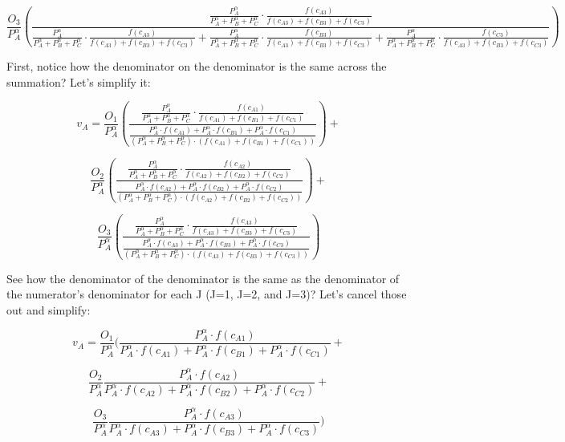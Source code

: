 \documentclass[]{elsarticle} %
\begin{document}
\[
\frac{O_3}{P_{A}^\alpha}(\frac{\frac{P_{A}^\alpha}{P_{A}^\alpha+P_{B}^\alpha+P_{C}^\alpha} \cdot \frac{f(c_{A3})}{f(c_{A3})+f(c_{B3})+f(c_{C3})}}{\frac{P_{A}^\alpha}{P_{A}^\alpha+P_{B}^\alpha+P_{C}^\alpha} \cdot \frac{f(c_{A3})}{f(c_{A3})+f(c_{B3})+f(c_{C3})} + \frac{P_{A}^\alpha}{P_{A}^\alpha+P_{B}^\alpha+P_{C}^\alpha} \cdot \frac{f(c_{B3})}{f(c_{A3})+f(c_{B3})+f(c_{C3})}+\frac{P_{A}^\alpha}{P_{A}^\alpha+P_{B}^\alpha+P_{C}^\alpha} \cdot \frac{f(c_{C3})}{f(c_{A3})+f(c_{B3})+f(c_{C3})}} )
\]

First, notice how the denominator on the denominator is the same across
the summation? Let's simplify it:

\[
v_{A} = \frac{O_1}{P_{A}^\alpha}(\frac{\frac{P_{A}^\alpha}{P_{A}^\alpha+P_{B}^\alpha+P_{C}^\alpha} \cdot \frac{f(c_{A1})}{f(c_{A1})+f(c_{B1})+f(c_{C1})}}{\frac{P_{A}^\alpha \cdot f(c_{A1}) + P_{A}^\alpha \cdot f(c_{B1}) + P_{A}^\alpha \cdot f(c_{C1})}{(P_{A}^\alpha+P_{B}^\alpha+P_{C}^\alpha) \cdot (f(c_{A1})+f(c_{B1})+f(c_{C1}))}}) +
\]

\[\frac{O_2}{P_{A}^\alpha}(\frac{\frac{P_{A}^\alpha}{P_{A}^\alpha+P_{B}^\alpha+P_{C}^\alpha} \cdot \frac{f(c_{A2})}{f(c_{A2})+f(c_{B2})+f(c_{C2})}}{\frac{P_{A}^\alpha \cdot f(c_{A2}) + P_{A}^\alpha \cdot f(c_{B2}) + P_{A}^\alpha \cdot f(c_{C2})}{(P_{A}^\alpha+P_{B}^\alpha+P_{C}^\alpha) \cdot (f(c_{A2})+f(c_{B2})+f(c_{C2}))}}) +
\]

\[
\frac{O_3}{P_{A}^\alpha}(\frac{\frac{P_{A}^\alpha}{P_{A}^\alpha+P_{B}^\alpha+P_{C}^\alpha} \cdot \frac{f(c_{A3})}{f(c_{A3})+f(c_{B3})+f(c_{C3})}}{\frac{P_{A}^\alpha \cdot f(c_{A3}) + P_{A}^\alpha \cdot f(c_{B3}) + P_{A}^\alpha \cdot f(c_{C3})}{(P_{A}^\alpha+P_{B}^\alpha+P_{C}^\alpha) \cdot (f(c_{A3})+f(c_{B3})+f(c_{C3}))}} )
\]

See how the denominator of the denominator is the same as the
denominator of the numerator's denominator for each J (J=1, J=2, and
J=3)? Let's cancel those out and simplify:

\[
v_{A} = \frac{O_1}{P_{A}^\alpha}(\frac{P_{A}^\alpha \cdot f(c_{A1})}{P_{A}^\alpha \cdot f(c_{A1}) + P_{A}^\alpha \cdot f(c_{B1}) + P_{A}^\alpha \cdot f(c_{C1})} +
\]

\[\frac{O_2}{P_{A}^\alpha}\frac{P_{A}^\alpha \cdot f(c_{A2})}{P_{A}^\alpha \cdot f(c_{A2}) + P_{A}^\alpha \cdot f(c_{B2}) + P_{A}^\alpha \cdot f(c_{C2})} +
\]

\[
\frac{O_3}{P_{A}^\alpha}\frac{P_{A}^\alpha \cdot f(c_{A3})}{P_{A}^\alpha \cdot f(c_{A3}) + P_{A}^\alpha \cdot f(c_{B3}) + P_{A}^\alpha \cdot f(c_{C3})} )
\]
\end{document}
